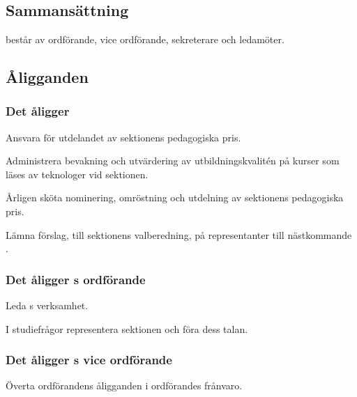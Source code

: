 \section{\SNITFULL}


\subsection{Sammansättning}
\SNIT{} består av ordförande, vice ordförande, sekreterare och ledamöter.

\subsection{Åligganden}

\subsubsection{Det åligger \SNIT}

\begin{att}
	\item Ansvara för utdelandet av sektionens pedagogiska pris. 
	\item Administrera bevakning och utvärdering av utbildningskvalitén på kurser som läses av teknologer vid sektionen.
	\item Årligen sköta nominering, omröstning och utdelning av sektionens pedagogiska pris.
	\item Lämna förslag, till sektionens valberedning, på representanter till nästkommande \SNIT.
\end{att}

\subsubsection{Det åligger \SNIT{}s ordförande}
\begin{att}
	\item Leda \SNIT{}s verksamhet.
	\item I studiefrågor representera sektionen och föra dess talan.
\end{att}

\subsubsection{Det åligger \SNIT{}s vice ordförande}
\begin{att}
	\item Överta ordförandens åligganden i ordförandes frånvaro.
\end{att}


